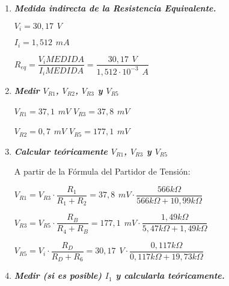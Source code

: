 \begin{enumerate}
	\item \textbf{\textit{Medida indirecta de la Resistencia Equivalente.}}
	
		$V_{i} = 30,17 \hspace{5pt}V  $
		
		$I_{i} = 1,512 \hspace{5pt}mA $
		
		$R_{e q} = \dfrac{V_{i}MEDIDA}{I_{i}MEDIDA} =  \dfrac{30,17 \hspace{5pt}V}{1,512 \cdot 10^{-3} \hspace{5pt}A} $ \hspace{10pt}
		\fboxrule=1pt \fboxsep=6pt
	
	\item \textbf{\textit{Medir $ V_{R1} $, $ V_{R2} $, $ V_{R3} $ y $ V_{R5} $}}
	
	\begin{center}
		$ V_{R1} = 37,1 \hspace{5pt}mV$ \hspace{10pt} $ V_{R3} = 37,8 \hspace{5pt}mV$
	
		$ V_{R2} = 0,7 \hspace{5pt}mV$ \hspace{10pt} $ V_{R5} = 177,1 \hspace{5pt}mV$
	\end{center}
	
	\item \textbf{\textit{Calcular teóricamente $ V_{R1} $, $ V_{R3} $ y $ V_{R5} $}}
	
	A partir de la Fórmula del Partidor de Tensión:
	
	$ V_{R1} = V_{R3} \cdot \dfrac{R_{1}}{R_{1} + R_{2}} = 37,8 \hspace{5pt}mV \cdot \dfrac{566 k\Omega}{566 k\Omega + 10,99 k\Omega}$ \hspace{15pt} \fboxrule=1pt \fboxsep=6pt
	
	$ V_{R3} = V_{R5} \cdot \dfrac{R_{B}}{R_{4} + R_{B}} = 177,1 \hspace{5pt}mV \cdot \dfrac{1,49 k\Omega}{5,47 k\Omega + 1,49 k\Omega}$ \hspace{10pt} \fboxrule=1pt \fboxsep=6pt
	
	$ V_{R5} = V_{i} \cdot \dfrac{R_{D}}{R_{D} + R_{6}} = 30,17 \hspace{5pt}V \cdot \dfrac{0,117 k\Omega}{0,117 k\Omega + 19,73 k\Omega}$ \hspace{16pt} \fboxrule=1pt \fboxsep=6pt
	\vspace{10pt}
	\item \textbf{\textit{Medir (si es posible) $ I_{1} $ y calcularla teóricamente. }}
	

\end{enumerate}
